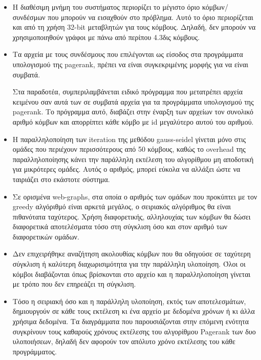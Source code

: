 \begin{itemize}[leftmargin=*]
\item Η διαθέσιμη μνήμη του συστήματος περιορίζει το μέγιστο όριο κόμβων/συνδέσμων που μπορούν να εισαχθούν στο πρόβλημα. Αυτό το όριο περιορίζεται και από τη χρήση 32-bit μεταβλητών για τους κόμβους. Δηλαδή, δεν μπορούν να χρησιμοποιηθούν γράφοι με πάνω από περίπου 4.3δις κόμβους.
\item Τα αρχεία με τους συνδέσμους που επιλέγονται ως είσοδος στα προγράμματα υπολογισμού της pagerank, πρέπει να είναι συγκεκριμένης μορφής για να είναι συμβατά.

Στα παραδοτέα, συμπεριλαμβάνεται ειδικό πρόγραμμα που μετατρέπει αρχεία κειμένου σαν αυτά των \textcite{snapnets} σε συμβατά αρχεία για τα προγράμματα υπολογισμού της pagerank. Το πρόγραμμα αυτό, διαβάζει στην έναρξη των αρχείων τον συνολικό αριθμό κόμβων και απορρίπτει κάθε κόμβο με id μεγαλύτερο αυτού του αριθμού.

\item Η παραλληλοποίηση των iteration της μεθόδου gauss-seidel γίνεται μόνο στις ομάδες που περιέχουν περισσότερους από 50 κόμβους, καθώς το overhead της παραλληλοποίησης κάνει την παράλληλη εκτέλεση του αλγορίθμου μη αποδοτική για μικρότερες ομάδες. Αυτός ο αριθμός, μπορεί εύκολα να αλλάξει ώστε να ταιριάζει στο εκάστοτε σύστημα.

\item Σε ορισμένα web-graphs, στα οποία ο αριθμός των ομάδων που προκύπτει με τον greedy αλγόριθμό είναι αρκετά μεγάλος, ο σειριακός αλγόριθμος θα είναι πιθανότατα ταχύτερος. Χρήση διαφορετικής, αλληλουχίας των κόμβων θα δώσει διαφορετικά αποτελέσματα τόσο στη σύγκλιση όσο και στον αριθμό των διαφορετικών ομάδων.

\item Δεν επιχειρήθηκε αναζήτηση ακολουθίας κόμβων που θα οδηγούσε σε ταχύτερη σύγκλιση ή καλύτερη διαχωρισιμότητα για την παράλληλη υλοποίηση. Όλοι οι κόμβοι διαβάζονται όπως βρίσκονται στο αρχείο και η παραλληλοποίηση γίνεται με τρόπο που δεν επηρεάζει τη σύγκλιση.

\item Τόσο η σειριακή όσο και η παράλληλη υλοποίηση, εκτός των αποτελεσμάτων, δημιουργούν σε κάθε τους εκτέλεση κι ένα αρχείο με δεδομένα χρόνων ή κι άλλα χρήσιμα δεδομένα. Τα διαγράμματα που παρουσιάζονται στην επόμενη ενότητα συγκρίνουν τους καθαρούς χρόνους εκτέλεσης του αλγορίθμου Pagerank των δυο υλοποιήσεων, δηλαδή δεν αφορούν τον απόλυτο χρόνο εκτέλεσης του κάθε προγράμματος.
\end{itemize}


